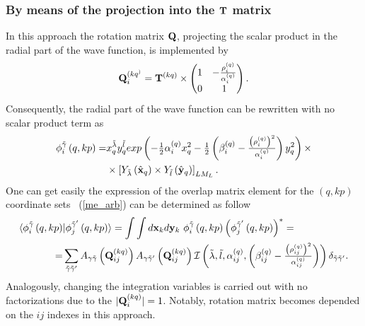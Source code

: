 \documentclass[12pt,a4paper,twoside]{article}
\begin{document}
\subsubsection{By means of the projection into the ${\bf T}$ matrix}
\label{overlap_by_proj}
In this approach the rotation matrix ${\bf Q}$, projecting the scalar product in the radial part of the wave function, is implemented by
\begin{equation}
{\bf Q}_i^{(kq^)}= {\bf T}^{(kq)} \times
\begin{pmatrix}
1 & -\tfrac{\rho^{(q)}_{i}}{\alpha^{(q)}_i} \\ 
0 & 1
\end{pmatrix} .
\end{equation}
Consequently, the radial part of the wave function can be rewritten with no scalar product term as
\begin{align}
\phi_{i}^{\tilde{\gamma} } \left(q, kp \right)  =  &
 x_{q}^{\tilde{\lambda}} y_{q}^{\tilde{l}} exp\left(- \tfrac{1}{2} \alpha^{(q)}_{i} x_{q}^{2} - \tfrac{1}{2} \left(  \beta^{(q)}_{i} - \tfrac{\left(\rho^{(q)}_i\right)^2}{\alpha^{(q)}_i} \right)  y_{q}^{2}  \right) 
\times  \nonumber \\ 
&\times  \left[ Y_{\tilde{\lambda}} \left(  \hat{ \bf x}_q \right) \times Y_{\tilde{l}} \left( \hat{\bf y}_q \right) \right]_{LM_L}.
\end{align}
One can get easily the expression of the overlap matrix element for the $(q,kp)$ coordinate sets ~(\ref{me_arb}) can be determined as follow
\begin{align}
\langle \phi_{i}^{\tilde{\gamma}}\left(q,kp \right) & \vert 
\phi_{j}^{\tilde{\gamma}^{\prime}}\left(q,kp \right) \rangle =
\int \int d{\bf x}_k d{\bf y}_k  ~\phi_{i}^{\tilde{\gamma}}\left(q,kp \right) \left( \phi_{j}^{\tilde{\gamma}^{\prime}}\left(q,kp \right) \right)^{*} =  \nonumber \\
=& \sum_{\tilde{\gamma}\tilde{\gamma}^{\prime}}  
A_{\gamma\tilde{\gamma}}\left( {\bf Q}_{ij}^{(kq)} \right)
 A_{\gamma\tilde{\gamma}^{\prime}}\left( {\bf Q}_{ij}^{(kq)} \right) \mathcal{I} \left( \tilde{\lambda}, \tilde{l}, \alpha^{(q)}_{ij}, \left(  \beta^{(q)}_{ij} - \tfrac{\left(\rho^{(q)}_{ij}\right)^2}{\alpha^{(q)}_{ij}} \right) \right) \delta_{\tilde{\gamma}\tilde{\gamma}^{\prime}}.
 \label{projectionMethod}
\end{align}
Analogously, changing the integration variables is carried out with no factorizations due to the $\vert {\bf Q}_i^{(kq)} \vert = 1$. Notably,   rotation matrix becomes depended on the $ij$ indexes in this approach.
\end{document}

